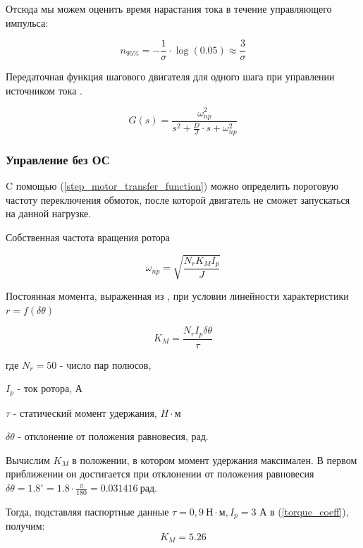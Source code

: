 Отсюда мы можем оценить время нарастания тока в течение управляющего импульса:

$$
    n_{ 95 \% } = - \frac{ 1 }{ \sigma }  \cdot \log{(0.05)} \approx \frac{ 3 }{ \sigma }
$$

Передаточная функция шагового двигателя для одного шага при управлении источником
тока \cite[гл. 4.2, ф-ла 4.65]{Kenio}.

\begin{equation}
    \label{step_motor_transfer_function}
    G(s) = \frac{ \omega_{np}^{2} }
                { s^{2} + \frac{D}{J} \cdot s + \omega_{np}^{2} }
\end{equation}

\newpage
\subsubsection{Управление без ОС}
C помощью (\ref{step_motor_transfer_function}) можно определить пороговую
частоту переключения обмоток, после которой двигатель не сможет запускаться на данной нагрузке.

Собственная частота вращения ротора \cite[гл. 4.2, ф-ла 4.48]{Kenio}

\begin{equation}
    \label{rotor_natural_frequency}
    \omega_{np} = \sqrt{\frac{N_{r}K_{M}I_{p}}{J}}
\end{equation}

Постоянная момента, выраженная из \cite[гл. 4.2, ф-ла 4.52]{Kenio}, при условии
линейности характеристики $r = f(\delta\theta)$

\begin{equation}
    \label{torque_coeff}
    K_{M} = \frac{N_{r}I_{p}\delta\theta}{\tau}
\end{equation}

где $N_{r} = 50$ - число пар полюсов,

$I_{p}$ - ток ротора, А

$\tau$ - статический момент удержания, $H \cdot \text{м}$

$\delta\theta$ - отклонение от положения равновесия, рад.
\newline

Вычислим $K_{M}$ в положении, в котором момент удержания максимален.
В первом приближении он достигается при отклонении от положения равновесия
$\delta\theta = 1.8^{\circ} = 1.8 \cdot \frac{\pi}{180} = 0.031416 ~\text{рад}$.

Тогда, подставляя паспортные данные $\tau = 0,9 ~\text{Н} \cdot \text{м}, I_{p} = 3$ А
в (\ref{torque_coeff}), получим:
\begin{equation}
    \label{first_approximation_moment_coeff}
    K_{M} = 5.26
\end{equation}

